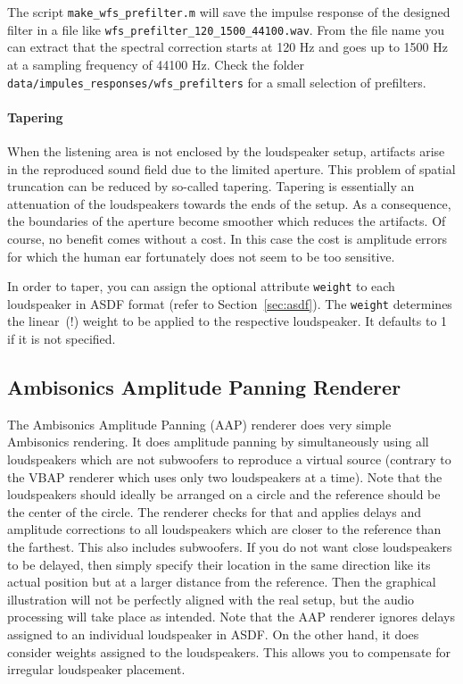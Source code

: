 The script \texttt{make\_wfs\_prefilter.m} will save the impulse response of
the designed filter in a file like
\texttt{wfs\_prefilter\_120\_1500\_44100.wav}. From the file name you can
extract that the spectral correction starts at 120 Hz and goes up to 1500 Hz at
a sampling frequency of 44100 Hz. Check the folder
\texttt{data/impules\_responses/wfs\_prefilters} for a small selection of
prefilters.
%
\paragraph{Tapering}%
%
When the listening area is not enclosed by the loudspeaker setup, artifacts
arise in the reproduced sound field due to the limited aperture. This problem
of spatial truncation can be reduced by so-called tapering. Tapering is
essentially an attenuation of the loudspeakers towards the ends of the setup.
As a consequence, the boundaries of the aperture become smoother which reduces
the artifacts. Of course, no benefit comes without a cost. In this case the
cost is amplitude errors for which the human ear fortunately does not seem to
be too sensitive.

In order to taper, you can assign the optional attribute \texttt{weight} to
each loudspeaker in ASDF format (refer to Section~\ref{sec:asdf}). The
\texttt{weight} determines the linear~(!) weight to be applied to the
respective loudspeaker. It defaults to 1 if it is not specified.


\subsection{Ambisonics Amplitude Panning Renderer}

The Ambisonics Amplitude Panning (AAP) renderer does very simple Ambisonics
rendering. It does amplitude panning by simultaneously using all loudspeakers
which are not subwoofers to reproduce a virtual source (contrary to the VBAP
renderer which uses only two loudspeakers at a time). Note that the
loudspeakers should ideally be arranged on a circle and the reference should be
the center of the circle. The renderer checks for that and applies delays and
amplitude corrections to all loudspeakers which are closer to the reference
than the farthest. This also includes subwoofers. If you do not want close
loudspeakers to be delayed, then simply specify their location in the same
direction like its actual position but at a larger distance from the reference.
Then the graphical illustration will not be perfectly aligned with the real
setup, but the audio processing will take place as intended. Note that the AAP
renderer ignores delays assigned to an individual loudspeaker in ASDF. On the
other hand, it does consider weights assigned to the loudspeakers. This allows
you to compensate for irregular loudspeaker placement.

